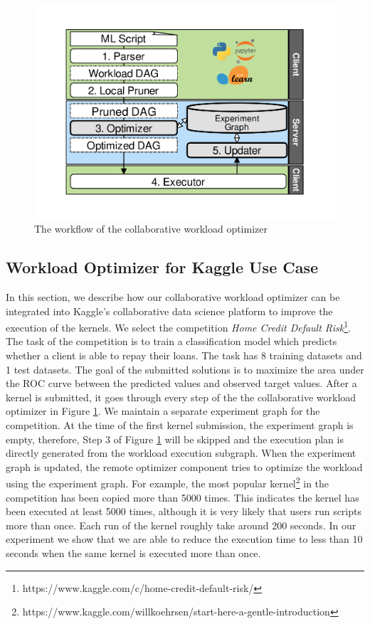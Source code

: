 {\begin{figure}
\centering
\includegraphics[width=\columnwidth]{../images/system-workflow}
\caption{The workflow of the collaborative workload optimizer}
\label{system-workflow}
\end{figure}


\subsection{Workload Optimizer for Kaggle Use Case}
In this section, we describe how our collaborative workload optimizer can be integrated into Kaggle's collaborative data science platform to improve the execution of the kernels.
We select the competition \textit{Home Credit Default Risk}\footnote{https://www.kaggle.com/c/home-credit-default-risk/}.
The task of the competition is to train a classification model which predicts whether a client is able to repay their loans.
The task has 8 training datasets and 1 test datasets.
The goal of the submitted solutions is to maximize the area under the ROC curve between the predicted values and observed target values.
After a kernel is submitted, it goes through every step of the the collaborative workload optimizer in Figure \ref{system-workflow}.
We maintain a separate experiment graph for the competition.
At the time of the first kernel submission, the experiment graph is empty, therefore, Step 3 of Figure \ref{system-workflow} will be skipped and the execution plan is directly generated from the workload execution subgraph.
When the experiment graph is updated, the remote optimizer component tries to optimize the workload using the experiment graph.
For example, the most popular kernel\footnote{https://www.kaggle.com/willkoehrsen/start-here-a-gentle-introduction} in the competition has been copied more than 5000 times.
This indicates the kernel has been executed at least 5000 times, although it is very likely that users run scripts more than once.
Each run of the kernel roughly take around 200 seconds.
In our experiment we show that we are able to reduce the execution time to less than 10 seconds when the same kernel is executed more than once.}

